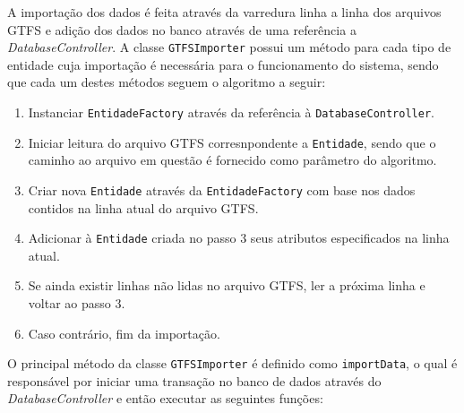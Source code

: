 A importação dos dados é feita através da varredura linha a linha dos arquivos GTFS e adição dos dados no banco através de uma referência a \emph{DatabaseController}.
A classe \texttt{GTFSImporter} possui um método para cada tipo de entidade cuja importação é necessária para o funcionamento do sistema, sendo que cada um destes métodos seguem o algoritmo a seguir:

\begin{enumerate}
	\item Instanciar \texttt{EntidadeFactory} através da referência à \texttt{DatabaseController}.
	\item Iniciar leitura do arquivo GTFS corresnpondente a \texttt{Entidade}, sendo que o caminho ao arquivo em questão é fornecido como parâmetro do algoritmo.
	\item Criar nova \texttt{Entidade} através da \texttt{EntidadeFactory} com base nos dados contidos na linha atual do arquivo GTFS.
	\item Adicionar à \texttt{Entidade} criada no passo 3 seus atributos especificados na linha atual.
	\item Se ainda existir linhas não lidas no arquivo GTFS, ler a próxima linha e voltar ao passo 3.
	\item Caso contrário, fim da importação.
\end{enumerate}

O principal método da classe \texttt{GTFSImporter} é definido como \texttt{importData}, o qual é responsável por iniciar uma transação no banco de dados através do \emph{DatabaseController} e então executar as seguintes funções:

